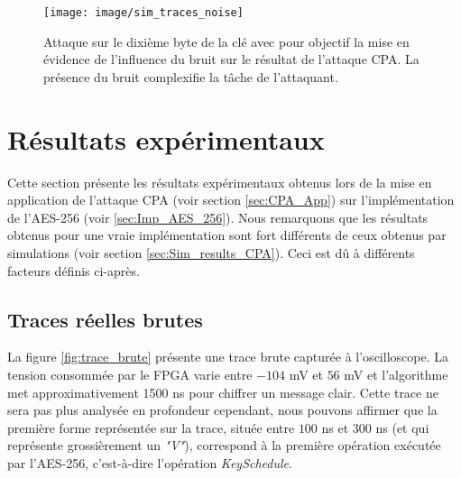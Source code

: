 \documentclass[oneside]{book}
\begin{document}
\begin{figure}[htbp]
    \hspace{-3.3cm}
    \texttt{[image: image/sim\_traces\_noise]}
    \caption{Attaque sur le dixième byte de la clé avec pour objectif la mise en évidence de l'influence du bruit sur le résultat de l'attaque CPA. La présence du bruit complexifie la tâche de l'attaquant.}
    \label{fig:success_rate_sim} 
\end{figure}

\newpage

\section{Résultats expérimentaux }
\label{sec:Exp_results_CPA}

Cette section présente les résultats expérimentaux obtenus lors de la mise en application de l'attaque CPA (voir section \ref{sec:CPA_App}) sur l'implémentation de l'AES-256 (voir \ref{sec:Imp_AES_256}). Nous remarquons que les résultats obtenus pour une vraie implémentation sont fort différents de ceux obtenus par simulations (voir section \ref{sec:Sim_results_CPA}). Ceci est dû à différents facteurs définis ci-après.

\subsection{Traces réelles brutes}
\label{sec:real_trace}

La figure \ref{fig:trace_brute} présente une trace brute capturée à l'oscilloscope. La tension consommée par le FPGA varie entre $-104$ \si{\milli\volt} et $56$ \si{\milli\volt} et l'algorithme met approximativement 1500 \si{\nano\second} pour chiffrer un message clair. Cette trace ne sera pas plus analysée en profondeur cependant, nous pouvons affirmer que la première forme représentée sur la trace, située entre $100$ \si{\nano\second} et $300$ \si{\nano\second} (et qui représente grossièrement un \textit{"V"}),  correspond à la première opération exécutée par l'AES-256, c'est-à-dire l'opération \textit{KeySchedule}.
\end{document}
